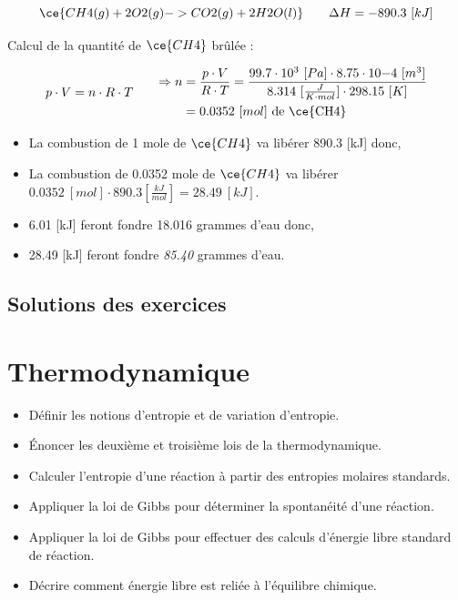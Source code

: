 \documentclass[
  11pt,
  a4paper,
  openany]{book}
\providecommand{\tightlist}{%
  \setlength{\itemsep}{0pt}\setlength{\parskip}{0pt}}
\begin{document}
\begin{Answer}

\[
\ce{CH4(g) + 2 O2(g) -> CO2(g) + 2 H2O(l)} \qquad \Delta H = - 890.3\ [kJ]
\]

Calcul de la quantité de \(\ce{CH4}\) brûlée :

\[
\begin{split}
p \cdot V = n \cdot R \cdot T
\end{split}
\qquad
\begin{split}
\Rightarrow n &= \frac{p \cdot V}{R \cdot T} = \frac{99.7 \cdot 10^{3}\ [Pa] \cdot 8.75 \cdot 10{-4}\ [m^3]}{8.314\ [\frac{J}{K \cdot mol}] \cdot 298.15\ [K]} \\
 &= 0.0352\ [mol] \text{ de \ce{CH4}}
\end{split}
\]

\begin{itemize}
\item
  La combustion de 1 mole de \(\ce{CH4}\) va libérer 890.3 {[}kJ{]} donc,
\item
  La combustion de 0.0352 mole de \(\ce{CH4}\) va libérer \(0.0352\ [mol] \cdot 890.3 [\frac{kJ}{mol}] = 28.49\ [kJ]\).
\item
  6.01 {[}kJ{]} feront fondre 18.016 grammes d'eau donc,
\item
  28.49 {[}kJ{]} feront fondre \emph{85.40} grammes d'eau.
\end{itemize}

\end{Answer}

\clearpage

\section{Solutions des exercices} \shipoutAnswer

\hypertarget{thermodynamique}{%
\chapter{Thermodynamique}\label{thermodynamique}}

\begin{objectives}

\begin{itemize}
\tightlist
\item
  Définir les notions d'entropie et de variation d'entropie.
\item
  Énoncer les deuxième et troisième lois de la thermodynamique.
\item
  Calculer l'entropie d'une réaction à partir des entropies molaires standards.
\item
  Appliquer la loi de Gibbs pour déterminer la spontanéité d'une réaction.
\item
  Appliquer la loi de Gibbs pour effectuer des calculs d'énergie libre standard de réaction.
\item
  Décrire comment énergie libre est reliée à l'équilibre chimique.
\end{itemize}

\end{objectives}
\end{document}
